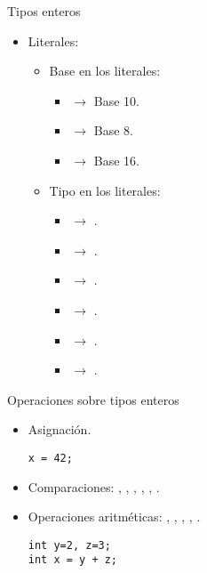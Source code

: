 \begin{frame}{Tipos enteros}
\begin{itemize}
  \item Literales:
    \begin{itemize}
      \item Base en los literales:
        \begin{itemize}
          \item {} $\rightarrow$ Base 10.
          \item {} $\rightarrow$ Base 8.
          \item {} $\rightarrow$ Base 16.
        \end{itemize}
      \item Tipo en los literales:
        \begin{itemize}
          \item {} $\rightarrow$ .
          \item {} $\rightarrow$ .
          \item {} $\rightarrow$ .
          \item {} $\rightarrow$ .
          \item {} $\rightarrow$ .
          \item {} $\rightarrow$ .
        \end{itemize}
    \end{itemize}
\end{itemize}
\end{frame}

\begin{frame}[fragile,t]{Operaciones sobre tipos enteros}
\begin{itemize}
      \item Asignación.
\begin{lstlisting}
x = 42;
\end{lstlisting}
      \item Comparaciones:
        \cppkey{==},
        \cppkey{!=},
        \cppkey{<},
        \cppkey{<=},
        \cppkey{>},
        \cppkey{>=}.
  \item Operaciones aritméticas: 
    \cppkey{+}, \cppkey{-}, \cppkey{*}, \cppkey{/}, \cppkey{\%}.
\begin{lstlisting}
int y=2, z=3;
int x = y + z;
\end{lstlisting}
\end{itemize}
\end{frame}

